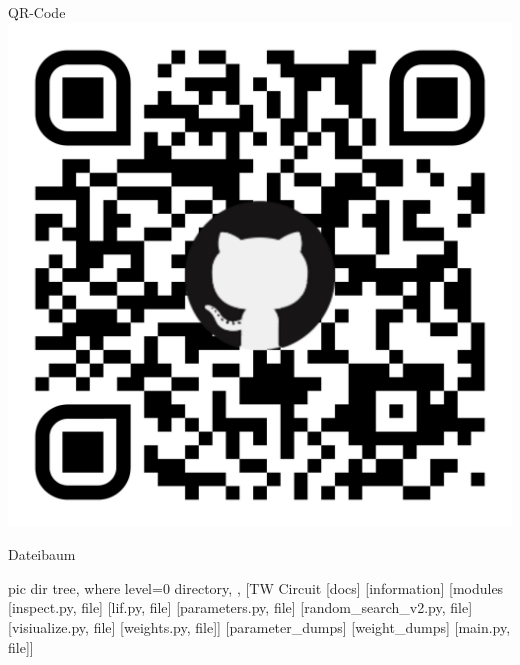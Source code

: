 \begin{minipage}[t]{0.35\textwidth}
	\begin{mybox}{QR-Code}
		\includegraphics[width=\textwidth]{figures/appendix/qr-code.pdf}
	\end{mybox}
	\begin{mybox}{Dateibaum}
		\vspace{0.3cm}
		\begin{forest}
			pic dir tree,
			where level=0{}{%
				directory,
			},
			[TW Circuit
			[docs]
			[information]
			[modules
			[inspect.py, file]
			[lif.py, file]
			[parameters.py, file]
			[random\_search\_v2.py, file]
			[visiualize.py, file]
			[weights.py, file]]
			[parameter\_dumps]
			[weight\_dumps]
			[main.py, file]]
		\end{forest}
	\end{mybox}
\end{minipage}


%
